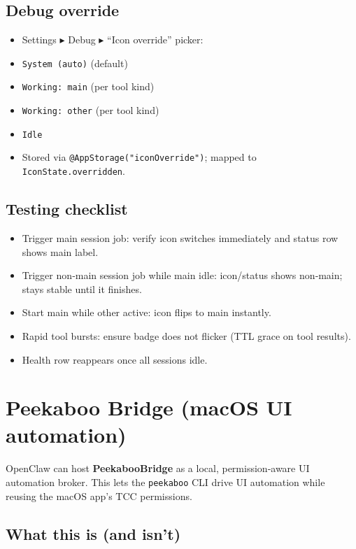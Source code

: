 \subsection{Debug override}


\begin{itemize}
  \item Settings ▸ Debug ▸ “Icon override” picker:
  \item \texttt{System (auto)} (default)
  \item \texttt{Working: main} (per tool kind)
  \item \texttt{Working: other} (per tool kind)
  \item \texttt{Idle}
  \item Stored via \texttt{@AppStorage("iconOverride")}; mapped to \texttt{IconState.overridden}.
\end{itemize}


\subsection{Testing checklist}


\begin{itemize}
  \item Trigger main session job: verify icon switches immediately and status row shows main label.
  \item Trigger non‑main session job while main idle: icon/status shows non‑main; stays stable until it finishes.
  \item Start main while other active: icon flips to main instantly.
  \item Rapid tool bursts: ensure badge does not flicker (TTL grace on tool results).
  \item Health row reappears once all sessions idle.
\end{itemize}



\clearpage

\section{Peekaboo Bridge (macOS UI automation)}


OpenClaw can host \textbf{PeekabooBridge} as a local, permission‑aware UI automation
broker. This lets the \texttt{peekaboo} CLI drive UI automation while reusing the
macOS app’s TCC permissions.

\subsection{What this is (and isn’t)}


